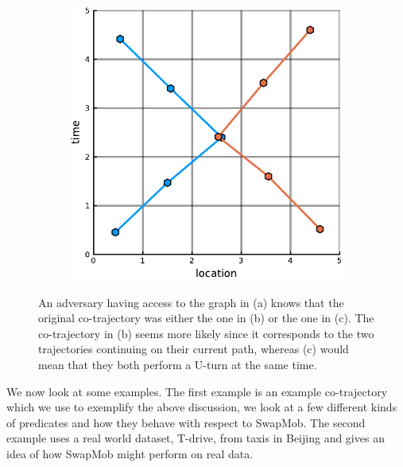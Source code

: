\documentclass[12pt]{article}
\theoremstyle{definition}
\begin{document}
\begin{figure}
\begin{subfigure}[t]{0.3\textwidth}
      \caption{}
      \label{fig:u-turn-b}
    \end{subfigure}
    \begin{subfigure}[t]{0.3\textwidth}
      \includegraphics[width=\textwidth]{uturn-c.pdf}
      \caption{}
      \label{fig:u-turn-c}
    \end{subfigure}
    \caption{An adversary having access to the graph in (a) knows that
      the original co-trajectory was either the one in (b) or the one
      in (c). The co-trajectory in (b) seems more likely since it
      corresponds to the two trajectories continuing on their current
      path, whereas (c) would mean that they both perform a U-turn at
      the same time.}
    \label{fig:u-turn}
\end{figure}

We now look at some examples. The first example is an example
co-trajectory which we use to exemplify the above discussion, we look
at a few different kinds of predicates and how they behave with
respect to SwapMob. The second example uses a real world dataset,
T-drive, from taxis in Beijing
\cite{yuan_t-drive:_2010,yuan_driving_2011} and gives an idea of how
SwapMob might perform on real data.
\end{document}
